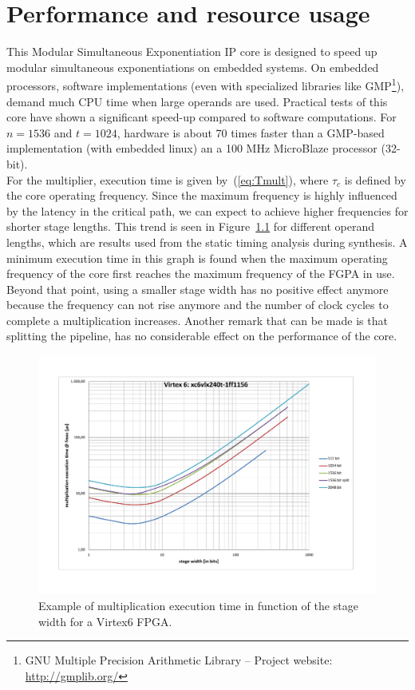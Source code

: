 \chapter{Performance and resource usage}

This Modular Simultaneous Exponentiation IP core is designed to speed up modular simultaneous exponentiations on embedded systems.
On embedded processors, software implementations (even with specialized libraries like GMP\footnote{GNU Multiple Precision Arithmetic Library -- Project website: \url{http://gmplib.org/}}), demand much CPU time when large operands are used.
Practical tests of this core have shown a significant speed-up compared to software computations. For $n=1536$ and $t=1024$, hardware is about 70 times faster than a GMP-based implementation (with embedded linux) an a 100 MHz MicroBlaze processor (32-bit).\\

For the multiplier, execution time is given by~(\ref{eq:Tmult}), where $\tau_c$ is defined by the core operating
frequency. Since the maximum frequency is highly influenced by the latency in the critical path, we can expect to
achieve higher frequencies for shorter stage lengths. This trend is seen in Figure~\ref{fig:Virtex6exctime} for
different operand lengths, which are results used from the static timing analysis during synthesis. A minimum execution
time in this graph is found when the maximum operating frequency of the core first reaches the maximum frequency of the
FGPA in use. Beyond that point, using a smaller stage width has no positive effect anymore because the frequency can not
rise anymore and the number of clock cycles to complete a multiplication increases. Another remark that can be made is
that splitting the pipeline, has no considerable effect on the performance of the core.

\begin{figure}[H]
\centering
\includegraphics[trim=2cm 2cm 2cm 2cm, width=16cm]{pictures/Virtex6_stagewidth.pdf}
\caption{Example of multiplication execution time in function of the stage width for a Virtex6 FPGA.}
\label{fig:Virtex6exctime}
\end{figure}

